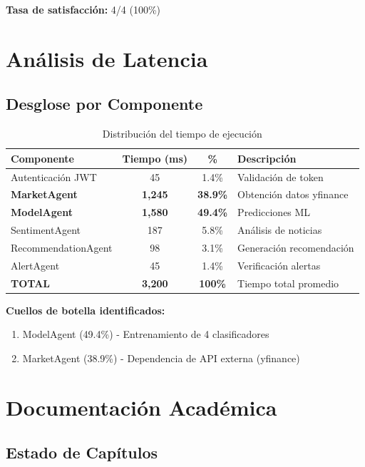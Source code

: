\documentclass[12pt,a4paper]{article}
\begin{document}
\textbf{Tasa de satisfacción:} 4/4 (100\%)

\section{Análisis de Latencia}

\subsection{Desglose por Componente}

\begin{table}[H]
\centering
\begin{tabular}{lccp{5.5cm}}
\toprule
\textbf{Componente} & \textbf{Tiempo (ms)} & \textbf{\%} & \textbf{Descripción} \\
\midrule
Autenticación JWT & 45 & 1.4\% & Validación de token \\
\textbf{MarketAgent} & \textbf{1,245} & \textbf{38.9\%} & Obtención datos yfinance \\
\textbf{ModelAgent} & \textbf{1,580} & \textbf{49.4\%} & Predicciones ML \\
SentimentAgent & 187 & 5.8\% & Análisis de noticias \\
RecommendationAgent & 98 & 3.1\% & Generación recomendación \\
AlertAgent & 45 & 1.4\% & Verificación alertas \\
\midrule
\textbf{TOTAL} & \textbf{3,200} & \textbf{100\%} & Tiempo total promedio \\
\bottomrule
\end{tabular}
\caption{Distribución del tiempo de ejecución}
\end{table}

\textbf{Cuellos de botella identificados:}
\begin{enumerate}
    \item ModelAgent (49.4\%) - Entrenamiento de 4 clasificadores
    \item MarketAgent (38.9\%) - Dependencia de API externa (yfinance)
\end{enumerate}

\section{Documentación Académica}

\subsection{Estado de Capítulos}
\end{document}
